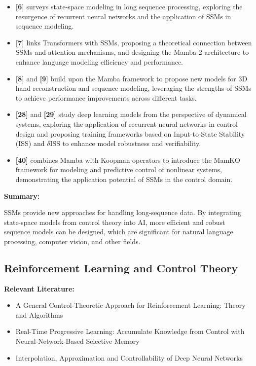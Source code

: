 \documentclass{article}
\theoremstyle{plain}
\theoremstyle{definition}
\theoremstyle{remark}
\begin{document}
\begin{itemize}
    \item \textbf{[6]} surveys state-space modeling in long sequence processing, exploring the resurgence of recurrent neural networks and the application of SSMs in sequence modeling.
    
    \item \textbf{[7]} links Transformers with SSMs, proposing a theoretical connection between SSMs and attention mechanisms, and designing the Mamba-2 architecture to enhance language modeling efficiency and performance.
    
    \item \textbf{[8]} and \textbf{[9]} build upon the Mamba framework to propose new models for 3D hand reconstruction and sequence modeling, leveraging the strengths of SSMs to achieve performance improvements across different tasks.
    
    \item \textbf{[28]} and \textbf{[29]} study deep learning models from the perspective of dynamical systems, exploring the application of recurrent neural networks in control design and proposing training frameworks based on Input-to-State Stability (ISS) and $\delta$ISS to enhance model robustness and verifiability.
    
    \item \textbf{[40]} combines Mamba with Koopman operators to introduce the MamKO framework for modeling and predictive control of nonlinear systems, demonstrating the application potential of SSMs in the control domain.
\end{itemize}

\textbf{Summary:}

SSMs provide new approaches for handling long-sequence data. By integrating state-space models from control theory into AI, more efficient and robust sequence models can be designed, which are significant for natural language processing, computer vision, and other fields.

\subsection{Reinforcement Learning and Control Theory}
\textbf{Relevant Literature:}
\begin{itemize}
    \item A General Control-Theoretic Approach for Reinforcement Learning: Theory and Algorithms
    \item Real-Time Progressive Learning: Accumulate Knowledge from Control with Neural-Network-Based Selective Memory
    \item Interpolation, Approximation and Controllability of Deep Neural Networks
\end{itemize}
\end{document}

